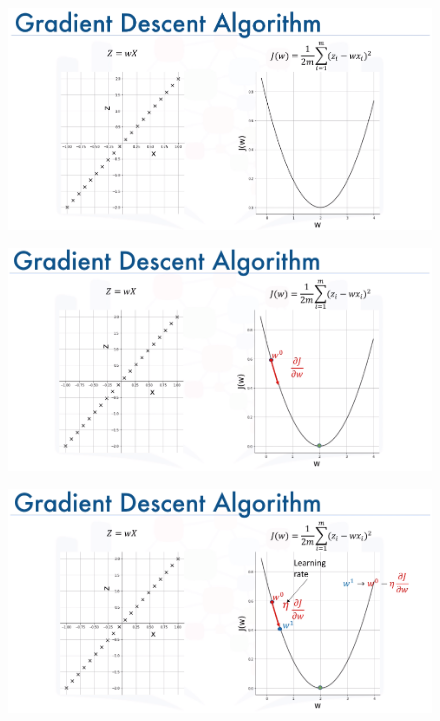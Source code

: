 \documentclass[10pt, compress]{beamer}
\begin{document}
\begin{frame}
  \begin{figure}
    \includegraphics[width=1\linewidth]{imgs/edx_dl_keras/gd1}
  \end{figure}
\end{frame}

\begin{frame}
  \begin{figure}
    \includegraphics[width=1\linewidth]{imgs/edx_dl_keras/gd2}
  \end{figure}
\end{frame}

\begin{frame}
  \begin{figure}
    \includegraphics[width=1\linewidth]{imgs/edx_dl_keras/gd3}
  \end{figure}
\end{frame}
\end{document}
